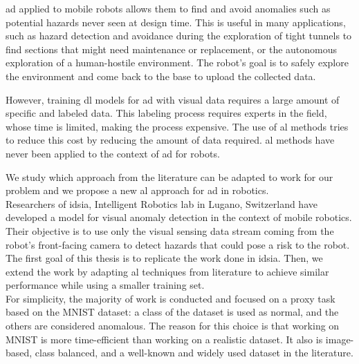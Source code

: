 \acrshort{ad} applied to mobile robots allows them to find and avoid anomalies such as potential hazards never seen at design time. This is useful in many applications, such as hazard detection and avoidance during the exploration of tight tunnels to find sections that might need maintenance or replacement, or the autonomous exploration of a human-hostile environment. The robot's goal is to safely explore the environment and come back to the base to upload the collected data.


However, training \acrshort{dl} models for \acrshort{ad} with visual data requires a large amount of specific and labeled data. This labeling process requires experts in the field, whose time is limited,  making the process expensive. The use of \acrshort{al} methods tries to reduce this cost by reducing the amount of data required. \acrshort{al} methods have never been applied to the context of \acrshort{ad} for robots.


We study which approach from the literature can be adapted to work for our problem and we propose a new \acrshort{al} approach for \acrshort{ad} in robotics.
\\


    Researchers of \acrfull{idsia}, Intelligent Robotics lab in Lugano, Switzerland have developed a model \cite{Idsia} for visual anomaly detection in the context of mobile robotics. Their objective is to use only the visual sensing data stream coming from the robot's front-facing camera to detect hazards that could pose a risk to the robot. 
    \\

    The first goal of this thesis is to replicate the work done in \acrshort{idsia}. Then, we extend the work by adapting \acrshort{al} techniques from literature to achieve similar performance while using a smaller training set.
    \\
    For simplicity, the majority of work is conducted and focused on a proxy task based on the MNIST dataset: a class of the dataset is used as normal, and the others are considered anomalous. The reason for this choice is that working on MNIST is more time-efficient than working on a realistic dataset. It also is image-based, class balanced, and a well-known and widely used dataset in the literature.
    
